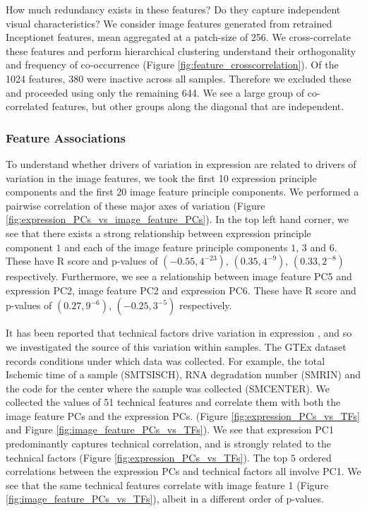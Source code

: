 \documentclass[graybox]{svmult}
\begin{document}
How much redundancy exists in these features? Do they capture independent visual characteristics? We consider image features generated from retrained Inceptionet features, mean aggregated at a patch-size of 256. We cross-correlate these features and perform hierarchical clustering understand their orthogonality and frequency of co-occurrence (Figure \ref{fig:feature_crosscorrelation}). Of the 1024 features, 380 were inactive across all samples. Therefore we excluded these and proceeded using only the remaining 644. We see a large group of co-correlated features, but other groups along the diagonal that are independent.

\subsubsection{Feature Associations}

To understand whether drivers of variation in expression are related to drivers of variation in the image features, we took the first 10 expression principle components and the first 20 image feature principle components. We performed a pairwise correlation of these major axes of variation (Figure \ref{fig:expression_PCs_vs_image_feature_PCs}). In the top left hand corner, we see that there exists a strong relationship between expression principle component $1$ and each of the image feature principle components $1$, $3$ and $6$. These have R score and p-values of $(-0.55, 4^{-23})$, $(0.35, 4^{-9})$, $(0.33, 2^{-8})$ respectively. Furthermore, we see a relationship between image feature PC5 and expression PC2, image feature PC2 and expression PC6. These have R score and p-values of $(0.27, 9^{-6})$, $(-0.25, 3^{-5}) $ respectively.


It has been reported that technical factors drive variation in expression \cite{complex-sources-of-variation}, and so we investigated the source of this variation within samples. The GTEx dataset records conditions under which data was collected. For example, the total Ischemic time of a sample (SMTSISCH), RNA degradation number (SMRIN) and the code for the center where the sample was collected (SMCENTER). We collected the values of 51 technical features and correlate them with both the image feature PCs and the expression PCs. (Figure \ref{fig:expression_PCs_vs_TFs} and Figure \ref{fig:image_feature_PCs_vs_TFs}). We see that expression PC1 predominantly captures technical correlation, and is strongly related to the technical factors (Figure \ref{fig:expression_PCs_vs_TFs}). The top $5$ ordered correlations between the expression PCs and technical factors all involve PC1. We see that the same technical features correlate with image feature 1 (Figure \ref{fig:image_feature_PCs_vs_TFs}), albeit in a different order of p-values.
\end{document}
